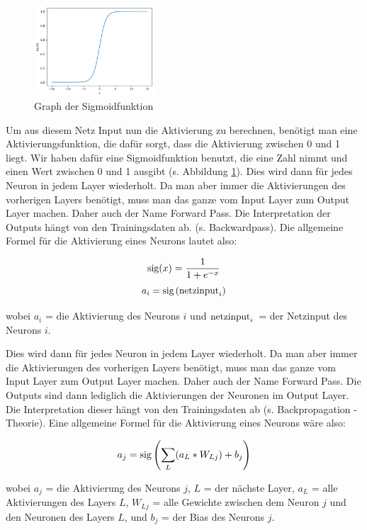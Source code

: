 \documentclass{scrartcl}
\begin{document}
	\newpage

	\begin{figure}
		\centering
		\includegraphics[width=0.4\textwidth]{pictures/sig_func.png}
		\caption{Graph der Sigmoidfunktion}
		\label{sig_func}
	\end{figure}

	Um aus diesem Netz Input nun die Aktivierung zu berechnen, benötigt man eine Aktivierungsfunktion, die dafür sorgt, dass die Aktivierung zwischen 0 und 1 liegt. Wir haben dafür eine Sigmoidfunktion benutzt, die eine Zahl nimmt und einen Wert zwischen 0 und 1 ausgibt (s. Abbildung \ref{sig_func}). Dies wird dann für jedes Neuron in jedem Layer wiederholt. Da man aber immer die Aktivierungen des vorherigen Layers benötigt, muss man das ganze vom Input Layer zum Output Layer machen. Daher auch der Name Forward Pass. Die Interpretation der Outputs hängt von den Trainingsdaten ab. (s. Backwardpass). Die allgemeine Formel für die Aktivierung eines Neurons lautet also:


	{\Large
	\[
		\textrm{sig}(x)=\frac{1}{1+e^{-x}}
		\]
	\[
		a_i=\textrm{sig}\left({\textrm{netzinput}}_i \right)
		\]}
	
	wobei $a_i$ = die Aktivierung des Neurons $i$ und $\textrm{netzinput}_{i}$ = der Netzinput des Neurons $i$.

	Dies wird dann für jedes Neuron in jedem Layer wiederholt. Da man aber immer die Aktivierungen des vorherigen Layers benötigt, muss man das ganze vom Input Layer zum Output Layer machen. Daher auch der Name Forward Pass. Die Outputs sind dann lediglich die Aktivierungen der Neuronen im Output Layer. Die Interpretation dieser hängt von den Trainingsdaten ab (s. Backpropagation - Theorie). Eine allgemeine Formel für die Aktivierung eines Neurons wäre also: 

	{\Large \[
		a_{j} = \textrm{sig}\left(\sum_{L} (a_{L} * W_{Lj}) + b_{j}\right)
		\]}
		
	\noindent wobei $a_j$ = die Aktivierung des Neurons $j$, $L$ = der nächste Layer, $a_L$ = alle Aktivierungen des Layers $L$, $W_{Lj}$ = alle Gewichte zwischen dem Neuron $j$ und den Neuronen des Layers $L$, und $b_j$ = der Bias des Neurons $j$. \cite{brotcrunsher:forwardpass}
	
\end{document}
